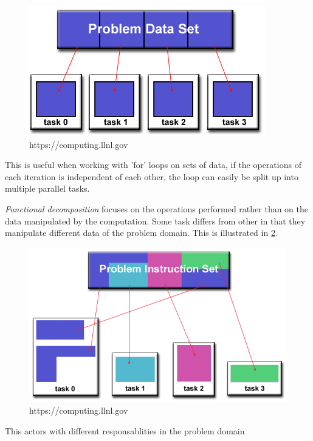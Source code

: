   \begin{figure}[htbp]
    \label{dom}  \includegraphics[width=\textwidth]{Analysis/Supercomputing/domain_decomp.png}
    \caption{https://computing.llnl.gov}
  \end{figure}

  This is useful when working with 'for' loops on sets of data, if the operations of each iteration is independent of each other, the loop can easily be split up into multiple parallel tasks.

  \emph{Functional decomposition} focuses on the operations performed rather than on the data manipulated by the computation. Some task differs from other in that they manipulate different data of the problem domain. This is illustrated in \cref{fun}.

  \begin{figure}[htbp]
    \label{fun}  \includegraphics[width=\textwidth]{Analysis/Supercomputing/functional_decomp.png}
    \caption{https://computing.llnl.gov}
  \end{figure}

  This actors with different responsablities in the problem domain
